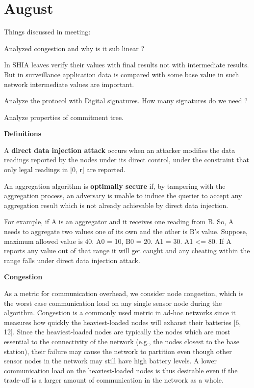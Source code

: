 \chapter{August}

Things discussed in meeting:
	
	Analyzed congestion and why is it sub linear ?
	
	In SHIA leaves verify their values with final results not with intermediate results. But in surveillance application data is compared with some base value in such network intermediate values are important. 

	Analyze the protocol with Digital signatures. How many signatures do we need ?

	Analyze properties of commitment tree.


\textbf{Definitions}

A \textbf{direct data injection attack} occurs when an attacker
modifies the data readings reported by the nodes under its direct
control, under the constraint that only legal readings in [0, r] are
reported.

An aggregation algorithm is \textbf{optimally secure} if, by
tampering with the aggregation process, an adversary is unable to
induce the querier to accept any aggregation result which is not
already achievable by direct data injection.

For example,
if A is an aggregator and it receives one reading from B. So, A needs to aggregate two values one of its own and the other is B's value. Suppose, maximum allowed value is 40. A0 = 10, B0 = 20. A1 = 30. A1 <= 80. If A reports any value out of that range it will get caught and any cheating within the range falls under direct data injection attack.

\textbf{Congestion}

As a metric for communication overhead, we consider node congestion,
which is the worst case communication load on any single
sensor node during the algorithm. Congestion is a commonly
used metric in ad-hoc networks since it measures how quickly the
heaviest-loaded nodes will exhaust their batteries [6, 12]. Since the
heaviest-loaded nodes are typically the nodes which are most essential
to the connectivity of the network (e.g., the nodes closest to
the base station), their failure may cause the network to partition
even though other sensor nodes in the network may still have high
battery levels. A lower communication load on the heaviest-loaded
nodes is thus desirable even if the trade-off is a larger amount of
communication in the network as a whole.

